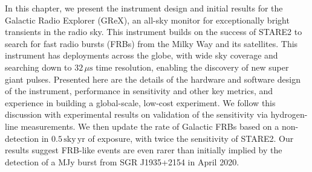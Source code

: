 In this chapter, we present the instrument design and initial results for the Galactic Radio Explorer (GReX), an all-sky monitor for exceptionally bright transients in the radio sky.
This instrument builds on the success of STARE2 to search for fast radio bursts (FRBs) from the Milky Way and its satellites.
This instrument has deployments across the globe, with wide sky coverage and searching down to $32\,\mu\text{s}$ time resolution, enabling the discovery of new super giant pulses.
Presented here are the details of the hardware and software design of the instrument, performance in sensitivity and other key metrics, and experience in building a global-scale, low-cost experiment.
We follow this discussion with experimental results on validation of the sensitivity via hydrogen-line measurements. We then update the rate of Galactic FRBs based on a non-detection in $0.5\,\text{sky}\,\text{yr}$ of exposure, with twice the sensitivity of STARE2. 
Our results suggest FRB-like events are even rarer than initially implied by the detection of a MJy burst from SGR J1935+2154 in April 2020.








